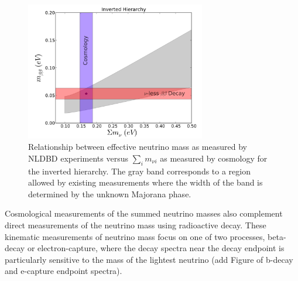 \begin{figure}[h!]
\centering \includegraphics[width=0.70\textwidth]{Neutrinos/IH_MajoranaPhase.png}
\caption{Relationship between effective neutrino mass as measured by NLDBD experiments versus $\sum_i m_{\nu i}$ as measured by cosmology for the inverted hierarchy. The gray band corresponds to a region allowed by existing measurements where the width of the band is determined by the unknown Majorana phase. }
\label{fig:MajoranaPhase}
\end{figure}



Cosmological measurements of the summed neutrino masses also complement direct measurements of the neutrino mass using radioactive decay. These kinematic measurements of neutrino mass focus on one of two processes, beta-decay or electron-capture, where the decay spectra near the decay endpoint is particularly sensitive to the mass of the lightest neutrino (add Figure of b-decay and e-capture endpoint spectra).

